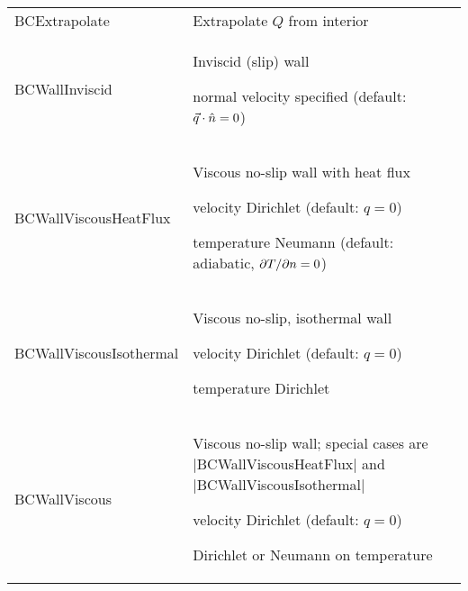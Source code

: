 \begin{longtable}{>{\ttfamily}p{\tmplengtha} >{\raggedright\arraybackslash}p{\Pwidth}}
BCExtrapolate           & Extrapolate $Q$ from interior \\[0.5\baselineskip]

BCWallInviscid          & Inviscid (slip) wall
                          \begin{mylist}
                          \item normal velocity specified (default:
                                ${\vec{q}}\cdot\hat{n} = 0$)
                          \end{mylist}\mbox{}\vspace{-0.5\baselineskip} \\

BCWallViscousHeatFlux   & Viscous no-slip wall with heat flux
                          \begin{mylist}
                          \item velocity Dirichlet (default: $q = 0$)
                          \item temperature Neumann (default: adiabatic,
                                ${\partial T / \partial n} = 0$)
                          \end{mylist}\mbox{}\vspace{-0.5\baselineskip} \\

BCWallViscousIsothermal & Viscous no-slip, isothermal wall
                          \begin{mylist}
                          \item velocity Dirichlet (default: $q = 0$)
                          \item temperature Dirichlet
                          \end{mylist}\mbox{}\vspace{-0.5\baselineskip} \\

BCWallViscous           & Viscous no-slip wall; special cases are
                          |BCWallViscousHeatFlux| and
                          |BCWallViscousIsothermal|
                          \begin{mylist}
                          \item velocity Dirichlet (default: $q = 0$)
                          \item Dirichlet or Neumann on temperature
                          \end{mylist}\mbox{}\vspace{-0.5\baselineskip} \\


\end{longtable}
